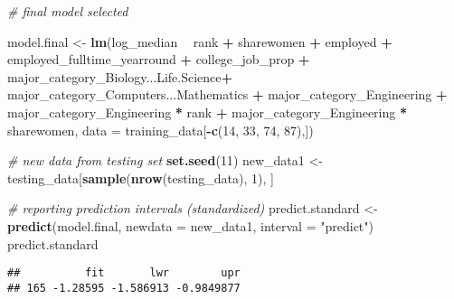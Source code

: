 \documentclass[
]{article}
\newenvironment{Shaded}{\begin{snugshade}}{\end{snugshade}}
\newcommand{\CommentTok}[1]{\textcolor[rgb]{0.56,0.35,0.01}{\textit{#1}}}
\newcommand{\DataTypeTok}[1]{\textcolor[rgb]{0.13,0.29,0.53}{#1}}
\newcommand{\DecValTok}[1]{\textcolor[rgb]{0.00,0.00,0.81}{#1}}
\newcommand{\KeywordTok}[1]{\textcolor[rgb]{0.13,0.29,0.53}{\textbf{#1}}}
\newcommand{\NormalTok}[1]{#1}
\newcommand{\OperatorTok}[1]{\textcolor[rgb]{0.81,0.36,0.00}{\textbf{#1}}}
\newcommand{\StringTok}[1]{\textcolor[rgb]{0.31,0.60,0.02}{#1}}
\begin{document}
\begin{Shaded}
\begin{Highlighting}[]
\CommentTok{# final model selected }

\NormalTok{model.final <-}\StringTok{ }\KeywordTok{lm}\NormalTok{(log_median }\OperatorTok{~}\StringTok{ }
\StringTok{                        }\NormalTok{rank }\OperatorTok{+}\StringTok{ }\NormalTok{sharewomen }\OperatorTok{+}\StringTok{ }
\StringTok{                        }\NormalTok{employed }\OperatorTok{+}\StringTok{ }\NormalTok{employed_fulltime_yearround }\OperatorTok{+}\StringTok{ }
\StringTok{                        }\NormalTok{college_job_prop }\OperatorTok{+}
\StringTok{                        }\NormalTok{major_category_Biology...Life.Science}\OperatorTok{+}
\StringTok{                        }\NormalTok{major_category_Computers...Mathematics }\OperatorTok{+}\StringTok{ }
\StringTok{                        }\NormalTok{major_category_Engineering }\OperatorTok{+}
\StringTok{                        }\NormalTok{major_category_Engineering }\OperatorTok{*}\StringTok{ }\NormalTok{rank }\OperatorTok{+}
\StringTok{                        }\NormalTok{major_category_Engineering }\OperatorTok{*}\StringTok{ }\NormalTok{sharewomen, }
                      \DataTypeTok{data =}\NormalTok{ training_data[}\OperatorTok{-}\KeywordTok{c}\NormalTok{(}\DecValTok{14}\NormalTok{, }\DecValTok{33}\NormalTok{, }\DecValTok{74}\NormalTok{, }\DecValTok{87}\NormalTok{),])}
                  

\CommentTok{# new data from testing set }
\KeywordTok{set.seed}\NormalTok{(}\DecValTok{11}\NormalTok{)}
\NormalTok{new_data1 <-}\StringTok{ }\NormalTok{testing_data[}\KeywordTok{sample}\NormalTok{(}\KeywordTok{nrow}\NormalTok{(testing_data), }\DecValTok{1}\NormalTok{), ]}


\CommentTok{# reporting prediction intervals (standardized)}
\NormalTok{predict.standard <-}\StringTok{ }\KeywordTok{predict}\NormalTok{(model.final, }\DataTypeTok{newdata =}\NormalTok{ new_data1, }\DataTypeTok{interval =} \StringTok{"predict"}\NormalTok{)}
\NormalTok{predict.standard}
\end{Highlighting}
\end{Shaded}

\begin{verbatim}
##          fit       lwr        upr
## 165 -1.28595 -1.586913 -0.9849877
\end{verbatim}
\end{document}
